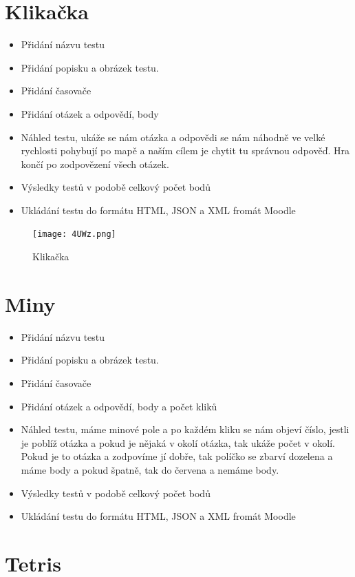 \documentclass[12pt, a4paper, twoside, openright]{report}
\begin{document}
    	\section{Klikačka}
\begin{itemize}
		\item Přidání názvu testu
		\item Přidání popisku a obrázek testu.
		\item Přidání časovače
            \item Přidání otázek a odpovědí, body
            \item Náhled testu, ukáže se nám otázka a odpovědi se nám náhodně ve velké rychlosti pohybují po mapě a naším cílem je chytit tu správnou odpověď. Hra končí po zodpovězení všech otázek.
            \item Výsledky testů v podobě celkový počet bodů
            \item Ukládání testu do formátu HTML, JSON a XML fromát Moodle
	\end{itemize}

    \begin{figure}[h]
		\centering
		\texttt{[image: 4UWz.png]}
		\caption{Klikačka}
		\label{fig:architecture}
	\end{figure}

    	\section{Miny}
\begin{itemize}
		\item Přidání názvu testu
		\item Přidání popisku a obrázek testu.
		\item Přidání časovače
            \item Přidání otázek a odpovědí, body a počet kliků
            \item Náhled testu, máme minové pole a po každém kliku se nám objeví číslo, jestli je poblíž otázka a pokud je nějaká v okolí otázka, tak ukáže počet v okolí. Pokud je to otázka a zodpovíme jí dobře, tak políčko se zbarví dozelena a máme body a pokud špatně, tak do červena a nemáme body.
            \item Výsledky testů v podobě celkový počet bodů
            \item Ukládání testu do formátu HTML, JSON a XML fromát Moodle
	\end{itemize}
  

    	\section{Tetris}
\end{document}

